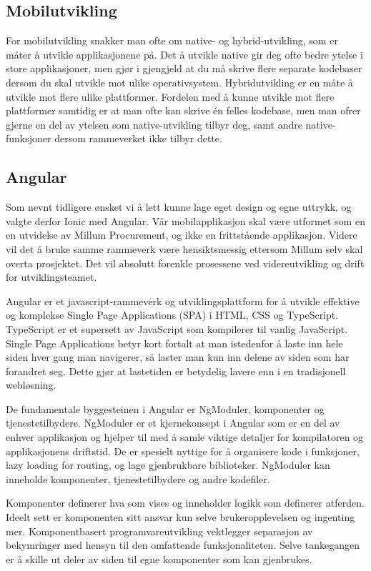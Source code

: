  \subsection{\textbf{Mobilutvikling}}
 For mobilutvikling snakker man ofte om native- og hybrid-utvikling, som er måter å utvikle applikasjonene på. Det å utvikle native gir deg ofte bedre ytelse i store applikasjoner, men gjør i gjengjeld at du må skrive flere separate kodebaser dersom du skal utvikle mot ulike operativsystem. Hybridutvikling er en måte å utvikle mot flere ulike plattformer. Fordelen med å kunne utvikle mot flere plattformer samtidig er at man ofte kan skrive én felles kodebase, men man ofrer gjerne en del av ytelsen som native-utvikling tilbyr deg, samt andre native-funksjoner dersom rammeverket ikke tilbyr dette. 
 
 

\subsection{\textbf{Angular}}
Som nevnt tidligere ønsket vi å lett kunne lage eget design og egne uttrykk, og valgte derfor Ionic med Angular. Vår mobilapplikasjon skal være utformet som en en utvidelse av Millum Procurement, og ikke en frittstående applikasjon. Videre vil det å bruke samme rammeverk være hensiktsmessig ettersom Millum selv skal overta prosjektet. Det vil absolutt forenkle prosessene ved videreutvikling og drift for utviklingsteamet.

Angular er et javascript-rammeverk og utviklingsplattform for å utvikle effektive og komplekse Single Page Applications (SPA) i HTML, CSS og TypeScript. TypeScript er et supersett av JavaScript som kompilerer til vanlig JavaScript. Single Page Applications betyr kort fortalt at man istedenfor å laste inn hele siden hver gang man navigerer, så laster man kun inn delene av siden som har forandret seg. Dette gjør at lastetiden er betydelig lavere enn i en tradisjonell webløsning. 

De fundamentale byggesteinen i Angular er NgModuler, komponenter og tjenestetilbydere. NgModuler er et kjernekonsept i Angular som er en del av enhver applikasjon og hjelper til med å samle viktige detaljer for kompilatoren og applikasjonens driftstid. De er spesielt nyttige for å organisere kode i funksjoner, lazy loading for routing, og lage gjenbrukbare biblioteker. NgModuler kan inneholde komponenter,  tjenestetilbydere og andre kodefiler.

Komponenter definerer hva som vises og inneholder logikk som definerer atferden. Ideelt sett er komponenten sitt ansvar kun selve brukeropplevelsen og ingenting mer. Komponentbasert programvareutvikling vektlegger separasjon av bekymringer med hensyn til den omfattende funksjonaliteten. Selve tankegangen er å skille ut deler av siden til egne komponenter som kan gjenbrukes. 


